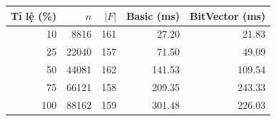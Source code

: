 \begin{tabular}{rrrrr}
\toprule
Tỉ lệ (\%) & $n$ & $|F|$ & Basic (ms) & BitVector (ms) \\
\midrule
10 & 8816 & 161 & 27.20 & 21.83 \\
25 & 22040 & 157 & 71.50 & 49.09 \\
50 & 44081 & 162 & 141.53 & 109.54 \\
75 & 66121 & 158 & 209.35 & 243.33 \\
100 & 88162 & 159 & 301.48 & 226.03 \\
\bottomrule
\end{tabular}
